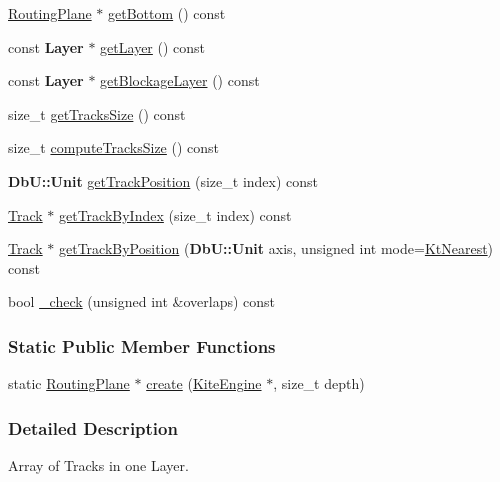 \begin{DoxyCompactItemize}
\hyperlink{classKite_1_1RoutingPlane}{Routing\-Plane} $\ast$ \hyperlink{classKite_1_1RoutingPlane_a0348ee05b44a4252874d0ffe6cb4e32c}{get\-Bottom} () const 
\item 
const {\bf Layer} $\ast$ \hyperlink{classKite_1_1RoutingPlane_a304ee4e02745811e04ac6fb688bf834f}{get\-Layer} () const 
\item 
const {\bf Layer} $\ast$ \hyperlink{classKite_1_1RoutingPlane_a6a7beca78f42f20b30ee11e5a67944f4}{get\-Blockage\-Layer} () const 
\item 
size\-\_\-t \hyperlink{classKite_1_1RoutingPlane_ac66ca5cc2e33b8d9482c33f4f902408f}{get\-Tracks\-Size} () const 
\item 
size\-\_\-t \hyperlink{classKite_1_1RoutingPlane_a9c981485b4732c5d598259f20b0d8aa6}{compute\-Tracks\-Size} () const 
\item 
{\bf Db\-U\-::\-Unit} \hyperlink{classKite_1_1RoutingPlane_a83f714d82c6e1f156873275b171d06ad}{get\-Track\-Position} (size\-\_\-t index) const 
\item 
\hyperlink{classKite_1_1Track}{Track} $\ast$ \hyperlink{classKite_1_1RoutingPlane_ae48fea9cd9f8f4c7df903e3f778d6bca}{get\-Track\-By\-Index} (size\-\_\-t index) const 
\item 
\hyperlink{classKite_1_1Track}{Track} $\ast$ \hyperlink{classKite_1_1RoutingPlane_a453b16df53120b5ab6dc19dfb7755a18}{get\-Track\-By\-Position} ({\bf Db\-U\-::\-Unit} axis, unsigned int mode=\hyperlink{namespaceKite_acca8fffa3182dea5f94208f454f14b47afaf04b2ddbae58557683c20373c0bada}{Kt\-Nearest}) const 
\item 
bool \hyperlink{classKite_1_1RoutingPlane_a421196d1d87ce7b2376c103e47b061d4}{\-\_\-check} (unsigned int \&overlaps) const 
\end{DoxyCompactItemize}
\subsubsection*{Static Public Member Functions}
\begin{DoxyCompactItemize}
\item 
static \hyperlink{classKite_1_1RoutingPlane}{Routing\-Plane} $\ast$ \hyperlink{classKite_1_1RoutingPlane_a91d1fdb3aac133a9f687207499caf1c4}{create} (\hyperlink{classKite_1_1KiteEngine}{Kite\-Engine} $\ast$, size\-\_\-t depth)
\end{DoxyCompactItemize}


\subsubsection{Detailed Description}
Array of Tracks in one Layer. 

